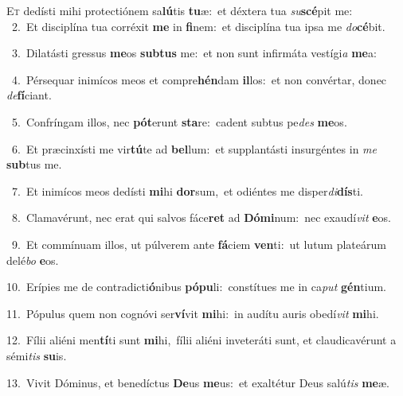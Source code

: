 \lettrine{\initial\textcolor{\initialcolor}{E}}{t} dedísti mihi protectiónem sa\-\textbf{lú}\-tis \textbf{tu}\-æ:~\star et déxtera tua \textit{su}\-\textbf{scé}pit me:\\
{\numbfont\textcolor{\numbcolor}{~2.}}~Et disciplína tua corréxit \textbf{me} in \textbf{fi}\-nem:~\star et disciplína tua ipsa me \textit{do}\-\textbf{cé}bit.\par
{\numbfont\textcolor{\numbcolor}{~3.}}~Dilatásti gressus \textbf{me}\-os \textbf{sub}\-\textbf{tus} me:~\star et non sunt infirmáta vestígi\textit{a} \textbf{me}\-a:\par
{\numbfont\textcolor{\numbcolor}{~4.}}~Pérsequar inimícos meos et compre\-\textbf{hén}\-dam \textbf{il}\-los:~\star et non convértar, donec \textit{de}\-\textbf{fí}ciant.\par
{\numbfont\textcolor{\numbcolor}{~5.}}~Confríngam illos, nec \textbf{pót}\-erunt \textbf{sta}\-re:~\star cadent subtus pe\textit{des} \textbf{me}\-os.\par
{\numbfont\textcolor{\numbcolor}{~6.}}~Et præcinxísti me vir\-\textbf{tú}\-te ad \textbf{bel}\-lum:~\star et supplantásti insurgéntes in \textit{me} \textbf{sub}\-tus me.\par
{\numbfont\textcolor{\numbcolor}{~7.}}~Et inimícos meos dedísti \textbf{mi}\-hi \textbf{dor}\-sum,~\star et odiéntes me disper\-\textit{di}\-\textbf{dís}ti.\par
{\numbfont\textcolor{\numbcolor}{~8.}}~Clamavérunt, nec erat qui salvos fáce\textbf{ret} ad \textbf{Dó}\-\textbf{mi}num:~\star nec exaudí\textit{vit} \textbf{e}\-os.\par
{\numbfont\textcolor{\numbcolor}{~9.}}~Et commínuam illos, ut púlverem ante \textbf{fá}\-ciem \textbf{ven}\-ti:~\star ut lutum plateárum delé\textit{bo} \textbf{e}\-os.\par
{\numbfont\textcolor{\numbcolor}{10.}}~Erípies me de contradicti\-\textbf{ó}\-nibus \textbf{pó}\-\textbf{pu}li:~\star constítues me in ca\textit{put} \textbf{gén}\-tium.\par
{\numbfont\textcolor{\numbcolor}{11.}}~Pópulus quem non cognóvi ser\-\textbf{ví}\-vit \textbf{mi}\-hi:~\star in audítu auris obedí\textit{vit} \textbf{mi}\-hi.\par
{\numbfont\textcolor{\numbcolor}{12.}}~Fílii aliéni men\-\textbf{tí}\-ti sunt \textbf{mi}\-hi,~\star fílii aliéni inveteráti sunt, et claudicavérunt a sémi\textit{tis} \textbf{su}\-is.\par
{\numbfont\textcolor{\numbcolor}{13.}}~Vivit Dóminus, et benedíctus \textbf{De}\-us \textbf{me}\-us:~\star et exaltétur Deus salú\textit{tis} \textbf{me}\-æ.\par
